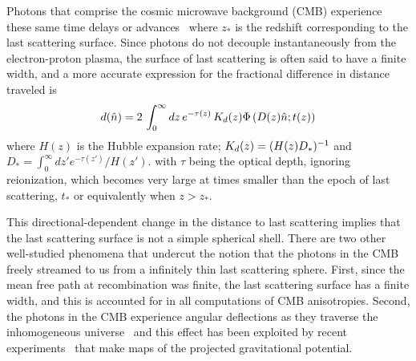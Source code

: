 \documentclass[prl,amsmath,amssymb,floatfix,superscriptaddress,nofootinbib,twocolumn]{revtex4-1}
\def\be{\begin{equation}}
\def\ee{\end{equation}}
\newcommand{\eql}[1]{\label{eq:#1}}
\newcommand{\wh}[1]{{\color{red} #1}}
\begin{document}
Photons that comprise the cosmic microwave background (CMB) experience these same time delays or advances~\cite{Hu:2001yq} where $z_*$ is the redshift corresponding to the last scattering surface. Since photons do not decouple instantaneously from the electron-proton plasma, the surface of last scattering is often said to have a finite width, and a more accurate expression for the fractional difference in distance traveled is
\be
\fd(\hat n) = 2\, \int_0^{\infty} dz \, e^{-\tau(z)}\, K_\fd(z)\Phi\left(D(z)\hat n; t(z)\right)
\eql{deffield}
\ee
where $H(z)$ is the Hubble expansion rate; $K_d(z) =  (H(z)D_*)^{-1}$ and $D_* =  \int_0^\infty dz' e^{-\tau(z') }/H(z')$.
with $\tau$ being the optical depth, ignoring reionization, which becomes very large at times smaller than the epoch of  last scattering, $t_*$ or equivalently when $z>z_*$.

This directional-dependent change in the distance to last scattering implies that the last scattering surface is not a simple spherical shell. There are two other well-studied phenomena that undercut the notion that the photons in the CMB freely streamed to us from a infinitely thin last scattering sphere. First, since the mean free path at recombination was finite, the last scattering surface has a finite width, and this is accounted for in all computations of CMB anisotropies. Second, the photons in the CMB experience angular deflections as they traverse the inhomogeneous universe~\cite{Hu:2001tn,Lewis:2006fu} and this effect has been exploited by recent experiments~\cite{Smith:2007rg,Ade:2013tyw,Story:2014hni,Sherwin:2016tyf,Aghanim:2018oex} that make maps of the projected gravitational potential.
\end{document}
